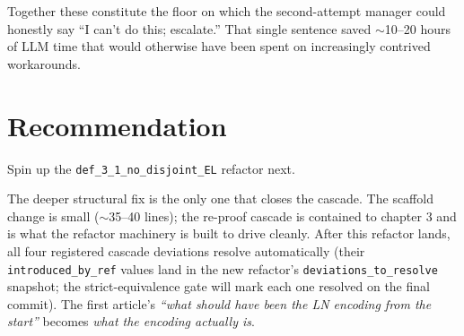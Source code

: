 \documentclass[11pt,a4paper]{article}
\begin{document}
Together these constitute the floor on which the second-attempt
manager could honestly say ``I can't do this; escalate.'' That
single sentence saved $\sim$10--20 hours of LLM time that would
otherwise have been spent on increasingly contrived workarounds.

\section{Recommendation}

Spin up the \texttt{def\_3\_1\_no\_disjoint\_EL} refactor next.

\medskip
The deeper structural fix is the only one that closes the cascade.
The scaffold change is small ($\sim$35--40 lines); the re-proof
cascade is contained to chapter 3 and is what the refactor
machinery is built to drive cleanly. After this refactor lands,
all four registered cascade deviations resolve automatically (their
\verb|introduced_by_ref| values land in the new refactor's
\verb|deviations_to_resolve| snapshot; the strict-equivalence gate
will mark each one resolved on the final commit). The first
article's \emph{``what should have been the LN encoding from the
start''} becomes \emph{what the encoding actually is}.
\end{document}
